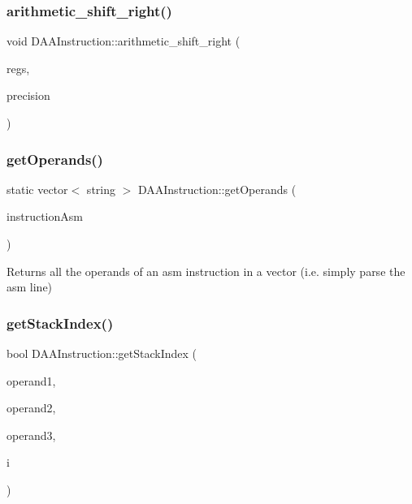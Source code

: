 \subsubsection{\texorpdfstring{arithmetic\+\_\+shift\+\_\+right()}{arithmetic\_shift\_right()}}
{\footnotesize\ttfamily void D\+A\+A\+Instruction\+::arithmetic\+\_\+shift\+\_\+right (\begin{DoxyParamCaption}\item[{\hyperlink{DAAInstruction_8h_af0fae93a861de9cf37988d5673cac523}{reg\+Table} \&}]{regs,  }\item[{\hyperlink{DAAInstruction_8h_a0e8cae02815a5f8adc750122d790b455}{reg\+Precision\+Table} \&}]{precision }\end{DoxyParamCaption})}

\mbox{\label{classDAAInstruction_a9a78da79cf0a261829690f0eb90af6cf}} 
\subsubsection{\texorpdfstring{get\+Operands()}{getOperands()}}
{\footnotesize\ttfamily static vector$<$ string $>$ D\+A\+A\+Instruction\+::get\+Operands (\begin{DoxyParamCaption}\item[{const string \&}]{instruction\+Asm }\end{DoxyParamCaption})\hspace{0.3cm}{\ttfamily [static]}}

Returns all the operands of an asm instruction in a vector (i.\+e. simply parse the asm line) \mbox{\label{classDAAInstruction_a41c1397757508bba967c2fa0baf2174e}} 
\subsubsection{\texorpdfstring{get\+Stack\+Index()}{getStackIndex()}}
{\footnotesize\ttfamily bool D\+A\+A\+Instruction\+::get\+Stack\+Index (\begin{DoxyParamCaption}\item[{string \&}]{operand1,  }\item[{string \&}]{operand2,  }\item[{string \&}]{operand3,  }\item[{int $\ast$}]{i }\end{DoxyParamCaption})}

